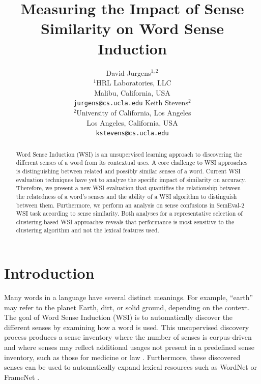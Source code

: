 \documentclass[11pt]{article}
\begin{document}
\author{David Jurgens$^{1,2}$\\
  $^{1}$HRL Laboratories, LLC\\
  Malibu, California, USA\\
  {\tt jurgens@cs.ucla.edu}
  \And
  Keith Stevens$^{2}$ \\
  $^2$University of California, Los Angeles\\
  Los Angeles, California, USA\\
  {\tt kstevens@cs.ucla.edu}}

\title{Measuring the Impact of Sense Similarity on Word Sense Induction}

\date{}

\maketitle

\begin{abstract}
Word Sense Induction (WSI) is an unsupervised learning approach to discovering
the different senses of a word from its contextual uses.  
A core challenge to
WSI approaches is distinguishing between related and possibly similar senses of
a word.  Current WSI evaluation techniques have yet to analyze the specific
impact of similarity on accuracy.
Therefore, we present a new WSI evaluation that quantifies the relationship
between the relatedness of a word's senses and the ability of a WSI algorithm to
distinguish between them.  Furthermore, we perform an analysis on sense
confusions in SemEval-2 WSI task according to sense similarity.
% 
Both analyses for a representative selection of clustering-based WSI approaches
reveals that performance is most sensitive to the clustering algorithm and not
the lexical features used.

\end{abstract}
  
\section{Introduction}

Many words in a language have several distinct meanings.  For example, ``earth''
may refer to the planet Earth, dirt, or solid ground, depending on the context.
The goal of Word Sense Induction (WSI) is to automatically discover the
different senses by examining how a word is used.  This unsupervised discovery
process produces a sense inventory where the number of senses is corpus-driven
and where senses may reflect additional usages not present in a predefined sense
inventory, such as those for medicine or law \cite{dorow03discovering}.
Furthermore, these discovered senses can be used to automatically expand lexical
resources such as WordNet or FrameNet \cite{klapaftis10taxonomy}.
\end{document}
